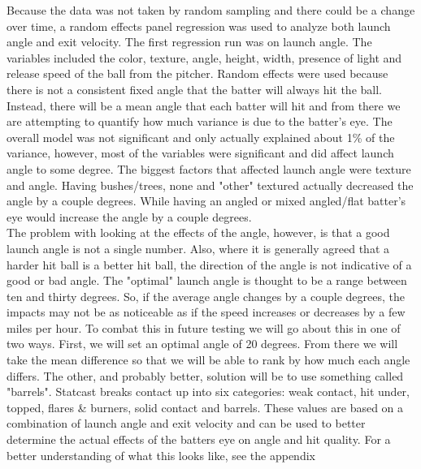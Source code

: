 \documentclass{article}
\begin{document}
\begin{doublespace}
Because the data was not taken by random sampling and there could be a change over time, a random effects panel regression was used to analyze both launch angle and exit velocity. The first regression run was on launch angle. The variables included the color, texture, angle, height, width, presence of light and release speed of the ball from the pitcher. Random effects were used because there is not a consistent fixed angle that the batter will always hit the ball. Instead, there will be a mean angle that each batter will hit and from there we are attempting to quantify how much variance is due to the batter's eye. The overall model was not significant and only actually explained about 1\% of the variance, however, most of the variables were significant and did affect launch angle to some degree. The biggest factors that affected launch angle were texture and angle. Having bushes/trees, none and "other" textured actually decreased the angle by a couple degrees. While having an angled or mixed angled/flat batter's eye would increase the angle by a couple degrees. \\ 

The problem with looking at the effects of the angle, however, is that a good launch angle is not a single number. Also, where it is generally agreed that a harder hit ball is a better hit ball, the direction of the angle is not indicative of a good or bad angle. The "optimal" launch angle is thought to be a range between ten and thirty degrees. So, if the average angle changes by a couple degrees, the impacts may not be as noticeable as if the speed increases or decreases by a few miles per hour. To combat this in  future testing we will go about this in one of two ways. First, we will set an optimal angle of 20 degrees. From there we will take the mean difference so that we will be able to rank by how much each angle differs. The other, and probably better, solution will be to use something called "barrels". Statcast breaks contact up into six categories: weak contact, hit under, topped, flares & burners, solid contact and barrels. These values are based on a combination of launch angle and exit velocity and can be used to better determine the actual effects of the batters eye on angle and hit quality. For a better understanding of what this looks like, see the appendix \\


\end{doublespace}
\end{document}
